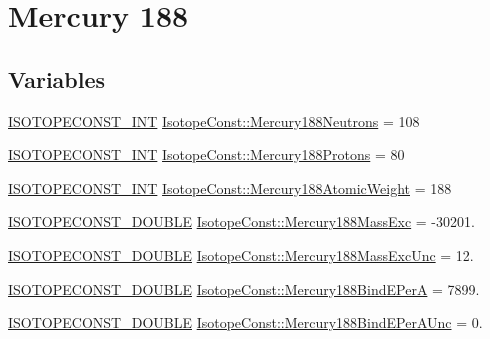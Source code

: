 \hypertarget{group___isotope_const-_mercury-_hg188}{}\section{Mercury 188}
\label{group___isotope_const-_mercury-_hg188}
\subsection*{Variables}
\begin{DoxyCompactItemize}
\item 
\mbox{\hyperlink{group___isotope_const-_macros_ga5f18360b3e99483a35c32d789e62621c}{I\+S\+O\+T\+O\+P\+E\+C\+O\+N\+S\+T\+\_\+\+I\+NT}} \mbox{\hyperlink{group___isotope_const-_mercury-_hg188_ga350fb9bb835652cefda7f1b52faead38}{Isotope\+Const\+::\+Mercury188\+Neutrons}} = 108
\item 
\mbox{\hyperlink{group___isotope_const-_macros_ga5f18360b3e99483a35c32d789e62621c}{I\+S\+O\+T\+O\+P\+E\+C\+O\+N\+S\+T\+\_\+\+I\+NT}} \mbox{\hyperlink{group___isotope_const-_mercury-_hg188_ga3919584d9043fd33c107ad7e8d116d84}{Isotope\+Const\+::\+Mercury188\+Protons}} = 80
\item 
\mbox{\hyperlink{group___isotope_const-_macros_ga5f18360b3e99483a35c32d789e62621c}{I\+S\+O\+T\+O\+P\+E\+C\+O\+N\+S\+T\+\_\+\+I\+NT}} \mbox{\hyperlink{group___isotope_const-_mercury-_hg188_gaa96d61f00310c71a36f262d9d8adaecf}{Isotope\+Const\+::\+Mercury188\+Atomic\+Weight}} = 188
\item 
\mbox{\hyperlink{group___isotope_const-_macros_ga8f45a7272ce02c0b4c65c44636ed719a}{I\+S\+O\+T\+O\+P\+E\+C\+O\+N\+S\+T\+\_\+\+D\+O\+U\+B\+LE}} \mbox{\hyperlink{group___isotope_const-_mercury-_hg188_ga05cfe5774162ef8d5dcb30bf7e083282}{Isotope\+Const\+::\+Mercury188\+Mass\+Exc}} = -\/30201.
\item 
\mbox{\hyperlink{group___isotope_const-_macros_ga8f45a7272ce02c0b4c65c44636ed719a}{I\+S\+O\+T\+O\+P\+E\+C\+O\+N\+S\+T\+\_\+\+D\+O\+U\+B\+LE}} \mbox{\hyperlink{group___isotope_const-_mercury-_hg188_ga3cbe257596078fbfe0acbddd34a63a1d}{Isotope\+Const\+::\+Mercury188\+Mass\+Exc\+Unc}} = 12.
\item 
\mbox{\hyperlink{group___isotope_const-_macros_ga8f45a7272ce02c0b4c65c44636ed719a}{I\+S\+O\+T\+O\+P\+E\+C\+O\+N\+S\+T\+\_\+\+D\+O\+U\+B\+LE}} \mbox{\hyperlink{group___isotope_const-_mercury-_hg188_ga7f6d7c2c00ee9f8d8f99937070c41db5}{Isotope\+Const\+::\+Mercury188\+Bind\+E\+PerA}} = 7899.
\item 
\mbox{\hyperlink{group___isotope_const-_macros_ga8f45a7272ce02c0b4c65c44636ed719a}{I\+S\+O\+T\+O\+P\+E\+C\+O\+N\+S\+T\+\_\+\+D\+O\+U\+B\+LE}} \mbox{\hyperlink{group___isotope_const-_mercury-_hg188_ga39c5f283528a01b9ccad0dbed4127c10}{Isotope\+Const\+::\+Mercury188\+Bind\+E\+Per\+A\+Unc}} = 0.

\end{DoxyCompactItemize}
